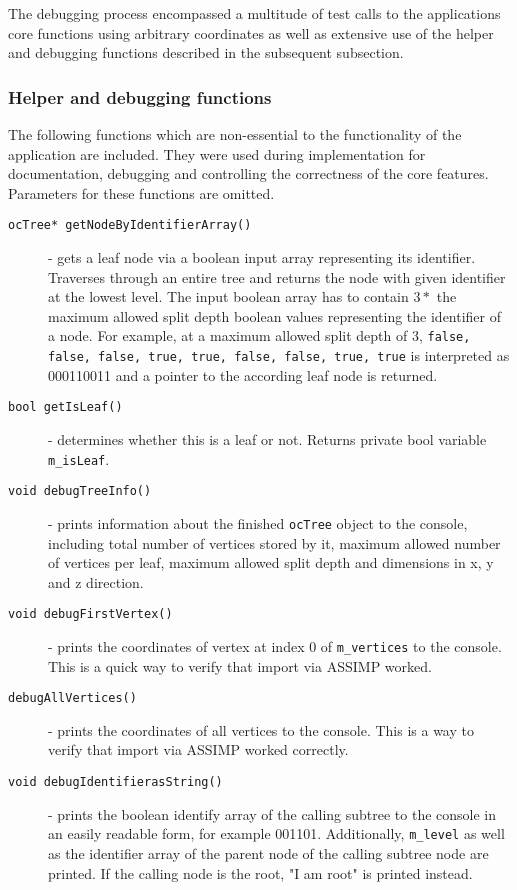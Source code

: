 The debugging process encompassed a multitude of test calls to the applications core functions using arbitrary coordinates as well as extensive use of the helper and debugging functions described in the subsequent subsection.

		\subsubsection{Helper and debugging functions}
		\label{sec:helper_and_debugging_functions}
The following functions which are non-essential to the functionality of the application are included. They were used during implementation for documentation, debugging and controlling the correctness of the core features. Parameters for these functions are omitted.

\begin{description}
	\item[\texttt{ocTree* getNodeByIdentifierArray()}] - gets a leaf node via a boolean input array representing its identifier. Traverses through an entire tree and returns the node with given identifier at the lowest level. The input boolean array has to contain $3*$ the maximum allowed split depth boolean values representing the identifier of a node. For example, at a maximum allowed split depth of 3, \texttt{false, false, false, true, true, false, false, true, true} is interpreted as 000110011 and a pointer to the according leaf node is returned.
	\item[\texttt{bool getIsLeaf()}] - determines whether this is a leaf or not. Returns private bool variable \texttt{m\_isLeaf}.
	\item[\texttt{void debugTreeInfo()}] - prints information about the finished \texttt{ocTree} object to the console, including total number of vertices stored by it, maximum allowed number of vertices per leaf, maximum allowed split depth and dimensions in x, y and z direction.
	\item[\texttt{void debugFirstVertex()}] - prints the coordinates of vertex at index 0 of \texttt{m\_vertices} to the console. This is a quick way to verify that import via ASSIMP worked.
	\item[\texttt{debugAllVertices()}] - prints the coordinates of all vertices to the console. This is a way to verify that import via ASSIMP worked correctly.
	\item[\texttt{void debugIdentifierasString()}] - prints the boolean identify array of the calling subtree to the console in an easily readable form, for example 001101.  Additionally, \texttt{m\_level} as well as the identifier array of the parent node of the calling subtree node are printed. If the calling node is the root, "I am root" is printed instead.
\end{description}

